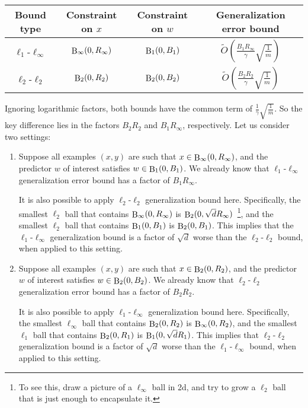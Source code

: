 \documentclass{article}
\DeclareMathOperator*{\B}{{\rm B}}
\begin{document}
\begin{table}[H]
\centering
\begin{tabular}{|c|c|c|c|}
\hline
Bound type & Constraint on $x$ & Constraint on $w$ & Generalization error bound \\
\hline
$\ell_1$-$\ell_\infty$ & $\B_\infty(0, R_\infty)$ & $\B_1(0, B_1)$ & $\tilde{O}(\frac{B_1 R_\infty}{\gamma} \sqrt{\frac{1}{m}})$ \\
$\ell_2$-$\ell_2$ & $\B_2(0, R_2)$ & $\B_2(0, B_2)$ & $\tilde{O}(\frac{B_2 R_2}{\gamma} \sqrt{\frac{1}{m}})$ \\
\hline
\end{tabular}
\end{table}
Ignoring logarithmic factors, both bounds have the common term of $\frac{1}{\gamma}\sqrt{\frac{1}{m}}$. So the key difference lies in the factors $B_2 R_2$ and $B_1 R_\infty$, respectively. Let us consider two settings:
\begin{enumerate}
\item Suppose all examples $(x,y)$ are such that $x \in \B_{\infty}(0, R_\infty)$, and the predictor $w$ of interest satisfies $w \in \B_1(0, B_1)$. We already know that $\ell_1$-$\ell_\infty$ generalization error bound has a factor of $B_1 R_\infty$.

It is also possible to apply $\ell_2$-$\ell_2$ generalization bound here.
Specifically, the smallest $\ell_2$ ball that contains $\B_{\infty}(0, R_\infty)$ is $\B_2(0, \sqrt{d} R_\infty)$~\footnote{To see this, draw a picture of a $\ell_\infty$ ball in 2d, and try to grow a $\ell_2$ ball that is just enough to encapsulate it.}, and the smallest $\ell_2$ ball that contains $\B_{1}(0, B_1)$ is $\B_2(0,B_1)$. This implies that
the $\ell_1$-$\ell_\infty$ generalization bound is a factor of $\sqrt{d}$ worse than the $\ell_2$-$\ell_2$ bound, when applied to this setting.

\item Suppose all examples $(x,y)$ are such that $x \in \B_{2}(0, R_2)$, and the predictor $w$ of interest satisfies $w \in \B_2(0, B_2)$. We already know that $\ell_2$-$\ell_2$ generalization error bound has a factor of $B_2 R_2$.

It is also possible to apply $\ell_1$-$\ell_\infty$ generalization bound here.
Specifically, the smallest $\ell_\infty$ ball that contains $\B_{2}(0, R_2)$ is $\B_\infty(0,R_2)$, and the smallest $\ell_1$ ball that contains $\B_{2}(0, R_1)$ is $\B_1(0,\sqrt{d} R_1)$.
This implies that $\ell_2$-$\ell_2$ generalization bound is a factor of $\sqrt{d}$ worse than the $\ell_1$-$\ell_\infty$ bound, when applied to this setting.
\end{enumerate}
\end{document}
